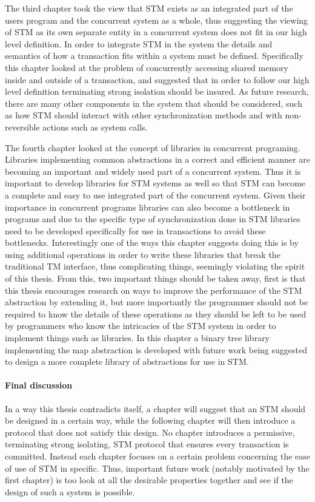 The third chapter took the view that STM exists as an integrated part
of the users program and the concurrent system as a whole, thus
suggesting the viewing of STM as its own separate entity in a concurrent system does not fit
in our high level definition.
In order to integrate STM in the system the details and semantics of how a transaction
fits within a system must be defined.
Specifically this chapter looked at the problem of concurrently accessing
shared memory inside and outside of a transaction, and suggested that in order
to follow our high level definition terminating strong isolation should be insured.
As future research, there are many other components in the system that should be considered,
such as how STM should interact with other synchronization methods
and with non-reversible actions such as system calls.


The fourth chapter looked at the concept of libraries in concurrent programing.
Libraries implementing common abstractions in a correct and efficient
manner are becoming an important and widely used part of a concurrent system.
Thus it is important to develop libraries for STM systems as well so that STM can become
a complete and easy to use integrated part of the concurrent system.
Given their importance in concurrent programs libraries can also become a bottleneck
in programs and due to the specific type of synchronization done in STM
libraries need to be developed specifically for use in transactions to avoid these bottlenecks.
Interestingly one of the ways this chapter suggests doing this is by using additional
operations in order to write these libraries that break the traditional TM interface, thus complicating things, seemingly
violating the spirit of this thesis.
From this, two important things should be taken away, first is that this thesis encourages
research on ways to improve the performance of the STM abstraction by extending it, but more importantly
the programmer should not be required to know the details of these operations as they should be left to be used by programmers
who know the intricacies of the STM system in order to implement things such as libraries.
In this chapter a binary tree library implementing the map abstraction is developed
with future work being suggested to design a more complete library of abstractions for use in STM.


\paragraph{Final discussion}
In a way this thesis contradicts itself, a chapter will suggest that an STM should
be designed in a certain way, while the following chapter will then introduce
a protocol that does not satisfy this design.
No chapter introduces a permissive, terminating strong isolating, STM protocol that ensures
every transaction is committed.
Instead each chapter focuses on a certain problem concerning the ease of use of STM
in specific.
Thus, important future work (notably motivated by the first chapter) is too look at all the desirable
properties together and see if the design of such a system is possible.


